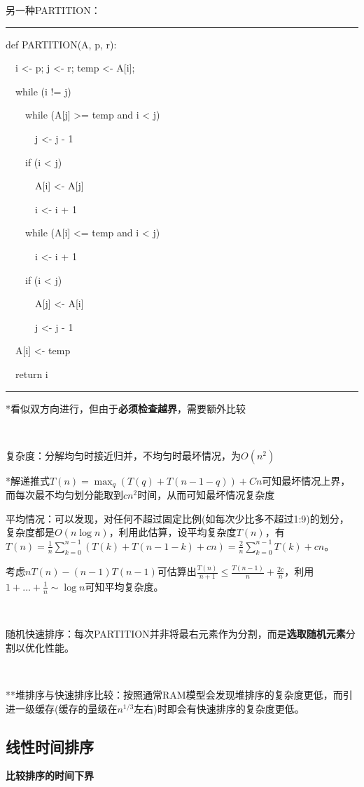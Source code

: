 \documentclass[a4paper,UTF8,fontset=windows]{ctexart}
\newenvironment{code}{\rule{36em}{0.1em}\setlength{\parindent}{1em}

}{

\setlength{\parindent}{0em}\rule{36em}{0.1em}}
\begin{document}
另一种PARTITION：

\begin{code}
def PARTITION(A, p, r):

\ \ i <- p; j <- r; temp <- A[i];

\ \ while (i != j)

\ \ \ \ while (A[j] >= temp and i < j)

\ \ \ \ \ \ j <- j - 1

\ \ \ \ if (i < j)

\ \ \ \ \ \ A[i] <- A[j]

\ \ \ \ \ \ i <- i + 1

\ \ \ \ while (A[i] <= temp and i < j)

\ \ \ \ \ \ i <- i + 1

\ \ \ \ if (i < j)

\ \ \ \ \ \ A[j] <- A[i]

\ \ \ \ \ \ j <- j - 1

\ \ A[i] <- temp

\ \ return i
\end{code}

*\hspace{0em}看似双方向进行，但由于\textbf{必须检查越界}，需要额外比较

\

复杂度：分解均匀时接近归并，不均匀时最坏情况，为$O(n^2)$

*\hspace{0em}解递推式$T(n)=\max_q(T(q)+T(n-1-q))+Cn$可知最坏情况上界，而每次最不均匀划分能取到$cn^2$时间，从而可知最坏情况复杂度

平均情况：可以发现，对任何不超过固定比例(如每次少比多不超过1:9)的划分，复杂度都是$O(n\log n)$，利用此估算，设平均复杂度$T(n)$，有$T(n)=\frac{1}{n}\sum_{k=0}^{n-1}(T(k)+T(n-1-k)+cn)=\frac{2}{n}\sum_{k=0}^{n-1}T(k)+cn$。

考虑$nT(n)-(n-1)T(n-1)$可估算出$\frac{T(n)}{n+1}\le\frac{T(n-1)}{n}+\frac{2c}{n}$，利用$1+\dots+\frac{1}{n}\sim \log n$可知平均复杂度。

\

随机快速排序：每次PARTITION并非将最右元素作为分割，而是\textbf{选取随机元素}分割以优化性能。

\

**\hspace{0em}堆排序与快速排序比较：按照通常RAM模型会发现堆排序的复杂度更低，而引进一级缓存(缓存的量级在$n^{1/3}$左右)时即会有快速排序的复杂度更低。

\subsection{线性时间排序}
\textbf{比较排序的时间下界}
\end{document}
